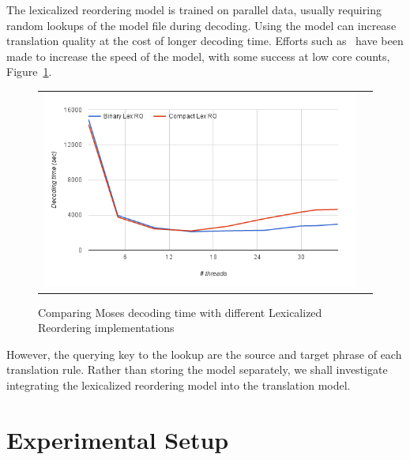 \documentclass[11pt]{article}
\begin{document}
The lexicalized reordering model is trained on parallel data, usually requiring random lookups of the model file during decoding. Using the model can increase translation quality at the cost of longer decoding time. Efforts such as~ have been made to increase the speed of the model, with some success at low core counts, Figure~\ref{fig:moses-lex-ro}.
\begin{figure}[h]
\centering
\begin{tabular}{cc}
{\includegraphics[scale=0.4]{moses-lex-ro.png}} 
\end{tabular}
\caption{Comparing Moses decoding time with different Lexicalized Reordering implementations}
\label{fig:moses-lex-ro}
\end{figure} 

However, the querying key to the lookup are the source and target phrase of each translation rule. Rather than storing the model separately, we shall investigate integrating the lexicalized reordering model into the translation model.


\section{Experimental Setup}
\end{document}
